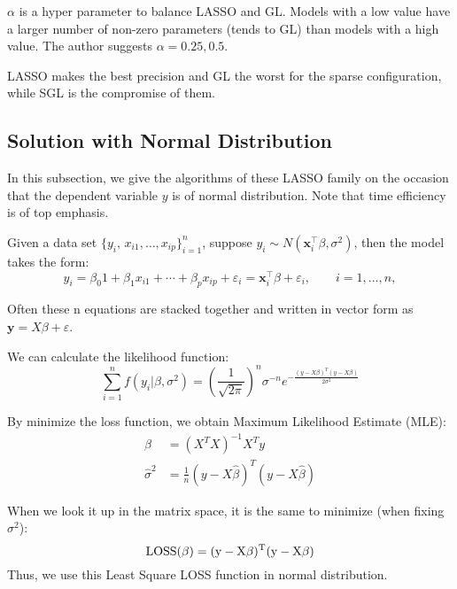 \documentclass[]{article}
\begin{document}
$ \alpha $ is a hyper parameter to balance LASSO and GL. Models with a low value have a larger number of non-zero parameters (tends to GL) than models with a high value. The author suggests $ \alpha=0.25,0.5 $.

LASSO makes the best precision and GL the worst for the sparse configuration, while SGL is the compromise of them.
\subsection{Solution with Normal Distribution}
In this subsection, we give the algorithms of these LASSO family on the occasion that the dependent variable $y$ is of normal distribution. Note that time efficiency is of top emphasis.

Given a data set $ \{y_i,\, x_{i1}, \ldots, x_{ip}\}_{i=1}^n $, suppose 
$y_i \sim N(\mathbf{x}^{\top}_i \beta,\sigma^2)$,
then the model takes the form:
\begin{equation}
y_i = \beta_0 1 + \beta_1 x_{i1} + \cdots + \beta_p x_{ip} + \varepsilon_i
= \mathbf{x}^{\top}_i \beta + \varepsilon_i,
\qquad i = 1, \ldots, n,
\end{equation}

Often these n equations are stacked together and written in vector form as
$ \mathbf{y} = X \beta +  \varepsilon $.

We can calculate the likelihood function:
\begin{equation}
\sum_{i=1}^nf(y_i|\beta,\sigma^2)=(\frac{1}{\sqrt{2\pi}})^n\sigma^{-n}e^{-\frac{(y-X\beta)^T(y-X\beta)}{2\sigma^2}}
\end{equation}

By minimize the loss function, we obtain Maximum Likelihood Estimate (MLE):
\begin{align}
	\hat{\beta}&=(X^TX)^{-1}X^Ty \\
	 \hat{\sigma}^2&=\frac{1}{n} (y-X\hat{\beta})^T(y-X\hat{\beta})
\end{align}

When we look it up in the matrix space, it is the same to minimize (when fixing $ \sigma^2 $):
\begin{equation}
\rm LOSS(\beta)=(y-X\beta)^T(y-X\beta)
\end{equation}
Thus, we use this Least Square LOSS function in normal distribution.
\end{document}

